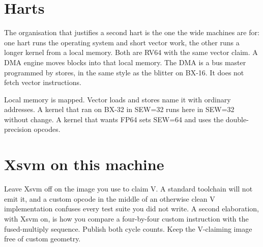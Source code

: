 \section{Harts}

The organisation that justifies a second hart is the one the wide machines are for: one hart runs the operating system and short vector work, the other runs a longer kernel from a local memory. Both are RV64 with the same vector claim. A DMA engine moves blocks into that local memory. The DMA is a bus master programmed by stores, in the same style as the blitter on BX-16. It does not fetch vector instructions.

Local memory is mapped. Vector loads and stores name it with ordinary addresses. A kernel that ran on BX-32 in SEW=32 runs here in SEW=32 without change. A kernel that wants FP64 sets SEW=64 and uses the double-precision opcodes.

\section{Xsvm on this machine}

Leave Xsvm off on the image you use to claim V. A standard toolchain will not emit it, and a custom opcode in the middle of an otherwise clean V implementation confuses every test suite you did not write. A second elaboration, with Xsvm on, is how you compare a four-by-four custom instruction with the fused-multiply sequence. Publish both cycle counts. Keep the V-claiming image free of custom geometry.
